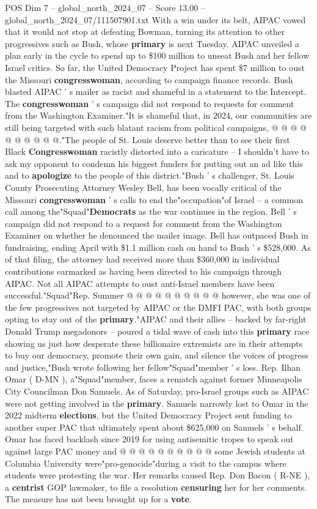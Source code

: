 \begin{textsample}{POS Dim 7 – global\_north\_2024\_07 – Score 13.00 – global\_north\_2024\_07/111507901.txt}
With a win under its belt, AIPAC vowed that it would not stop at defeating Bowman, turning its attention to other progressives such as Bush, whose \textbf{primary} is next Tuesday.
AIPAC unveiled a plan early in the cycle to spend up to \$100 million to unseat Bush and her fellow Israel critics.
So far, the United Democracy Project has spent \$7 million to oust the Missouri \textbf{congresswoman}, according to campaign finance records.
Bush blasted AIPAC ' s mailer as racist and shameful in a statement to the Intercept.
The \textbf{congresswoman} ' s campaign did not respond to requests for comment from the Washington Examiner."It is shameful that, in 2024, our communities are still being targeted with such blatant racism from political campaigns, @ @ @ @ @ @ @ @ @ @."The people of St.
Louis deserve better than to see their first Black \textbf{Congresswoman} racistly distorted into a caricature -- I shouldn't have to ask my opponent to condemn his biggest funders for putting out an ad like this and to \textbf{apologize} to the people of this district."Bush ' s challenger, St.
Louis County Prosecuting Attorney Wesley Bell, has been vocally critical of the Missouri \textbf{congresswoman} ' s calls to end the"occupation"of Israel -- a common call among the"Squad"\textbf{Democrats} as the war continues in the region.
Bell ' s campaign did not respond to a request for comment from the Washington Examiner on whether he denounced the mailer image.
Bell has outpaced Bush in fundraising, ending April with \$1.1 million cash on hand to Bush ' s \$528,000.
As of that filing, the attorney had received more than \$360,000 in individual contributions earmarked as having been directed to his campaign through AIPAC.
Not all AIPAC attempts to oust anti-Israel members have been successful."Squad"Rep.
Summer @ @ @ @ @ @ @ @ @ @ however, she was one of the few progressives not targeted by AIPAC or the DMFI PAC, with both groups opting to stay out of the \textbf{primary}."AIPAC and their allies -- backed by far-right Donald Trump megadonors -- poured a tidal wave of cash into this \textbf{primary} race showing us just how desperate these billionaire extremists are in their attempts to buy our democracy, promote their own gain, and silence the voices of progress and justice,"Bush wrote following her fellow"Squad"member ' s loss.
Rep.
Ilhan Omar ( D-MN ), a"Squad"member, faces a rematch against former Minneapolis City Councilman Don Samuels.
As of Saturday, pro-Israel groups such as AIPAC were not getting involved in the \textbf{primary}.
Samuels narrowly lost to Omar in the 2022 midterm \textbf{elections}, but the United Democracy Project sent funding to another super PAC that ultimately spent about \$625,000 on Samuels ' s behalf.
Omar has faced backlash since 2019 for using antisemitic tropes to speak out against large PAC money and @ @ @ @ @ @ @ @ @ @ some Jewish students at Columbia University were"pro-genocide"during a visit to the campus where students were protesting the war.
Her remarks caused Rep.
Don Bacon ( R-NE ), a \textbf{centrist} GOP lawmaker, to file a resolution \textbf{censuring} her for her comments.
The measure has not been brought up for a \textbf{vote}.


\end{textsample}
